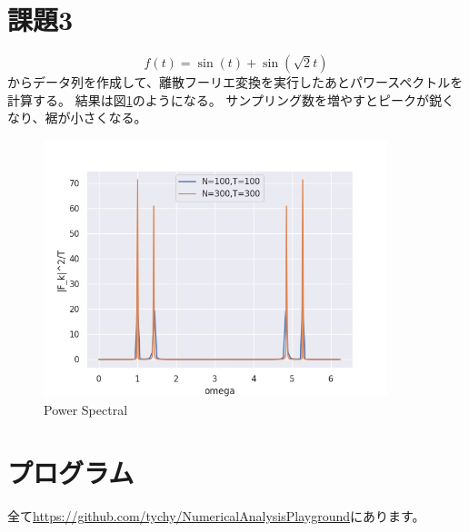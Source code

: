 \documentclass{jsarticle}
\begin{document}
\section{課題3}
\begin{equation}
    f(t) = \sin(t) + \sin(\sqrt{2}t)
\end{equation}
からデータ列を作成して、離散フーリエ変換を実行したあとパワースペクトルを計算する。
結果は図\ref{f7}のようになる。
サンプリング数を増やすとピークが鋭くなり、裾が小さくなる。
\begin{figure}[htbp]
    \includegraphics[clip,width=10.0cm]{./power.png}
    \caption{Power Spectral}
    \label{f7}
\end{figure}
\section{プログラム}
全て\href{https://github.com/tychy/NumericalAnalysisPlayground}{https://github.com/tychy/NumericalAnalysisPlayground}にあります。


\end{document}
